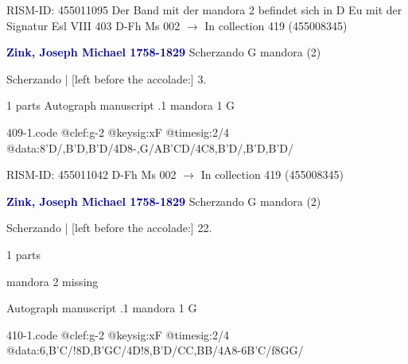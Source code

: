 \documentclass[twocolumn]{book}
\begin{document}
\newline RISM-ID: 455011095
\newline Der Band mit der mandora 2 befindet sich in D Eu mit der Signatur Esl VIII 403
\newline D-Fh  Ms 002
\newline $\rightarrow$ In collection 419 (455008345)

\newline \par \vspace{7pt} \textcolor{darkblue}{\textbf{Zink, Joseph Michael  1758-1829}}
\newline Scherzando  G  
\newline mandora (2)
\newline \begin{itshape} Scherzando | [left before the accolade:] 3.\end{itshape} 
\newline \textcolor{darkblue}{}  1 parts  
\newline Autograph manuscript
.1  mandora 1  G  
\begin{filecontents*}{409-1.code}
@clef:g-2
@keysig:xF
@timesig:2/4
@data:8'D/,B'D,B'D/4D8-,G/AB'CD/4C8,B'D/,B'D,B'D/
\end{filecontents*}
\newline
%

\newline RISM-ID: 455011042
\newline D-Fh  Ms 002
\newline $\rightarrow$ In collection 419 (455008345)

\newline \par \vspace{7pt} \textcolor{darkblue}{\textbf{Zink, Joseph Michael  1758-1829}}
\newline Scherzando  G  
\newline mandora (2)
\newline \begin{itshape}[f.15r, at left:] Scherzando | [left before the accolade:] 22.\end{itshape} 
\newline \textcolor{darkblue}{}  1 parts  
\newline \begin{small} mandora 2 missing\end{small} 
\newline Autograph manuscript
.1  mandora 1  G  
\begin{filecontents*}{410-1.code}
@clef:g-2
@keysig:xF
@timesig:2/4
@data:{6,B'C}/!8D,B'GC/4D!8,B'D/CC,BB/4A8-{6B'C}/f{8GG}/
\end{filecontents*}
\newline
%
\end{document}
